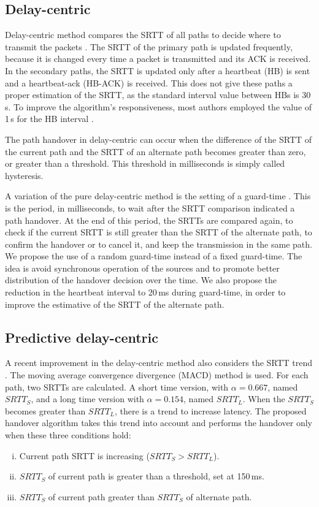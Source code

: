 \documentclass[letterpaper,10pt,oneside,conference,final]{sbrt2015}
\begin{document}
  \subsection{Delay-centric}

  Delay-centric method compares the SRTT of all paths to decide where to transmit the packets \cite{Kelly2004}. The SRTT of the primary path is updated frequently, because it is changed every time a packet is transmitted and its ACK is received. In the secondary paths, the SRTT is updated only after a heartbeat (HB) is sent and a heartbeat-ack (HB-ACK) is received. This does not give these paths a proper estimation of the SRTT, as the standard interval value between HBs is 30\,s. To improve the algorithm's responsiveness, most authors employed the value of 1\,s for the HB interval \cite{Noonan2004b}\cite{Gavriloff2009}\cite{Torres2014}.

The path handover in delay-centric can occur when the difference of the SRTT of the current path and the SRTT of an alternate path becomes greater than zero, or greater than a threshold. This threshold in milliseconds is simply called hysteresis.

A variation of the pure delay-centric method is the setting of a guard-time \cite{Leung2012}. This is the period, in milliseconds, to wait after the SRTT comparison indicated a path handover. At the end of this period, the SRTTs are compared again, to check if the current SRTT is still greater than the SRTT of the alternate path, to confirm the handover or to cancel it, and keep the transmission in the same path. We propose the use of a random guard-time instead of a fixed guard-time. The idea is avoid synchronous operation of the sources and to promote better distribution of the handover decision over the time. We also propose the reduction in the heartbeat interval to 20\,ms during guard-time, in order to improve the estimative of the SRTT of the alternate path.

  \subsection{Predictive delay-centric}

  A recent improvement in the delay-centric method also considers the SRTT trend \cite{Torres2014}. The moving average convergence divergence (MACD) method is used. For each path, two SRTTs are calculated. A short time version, with $\alpha = 0.667$, named $SRTT_S$, and a long time version with $\alpha = 0.154$, named $SRTT_L$. When the $SRTT_S$ becomes greater than $SRTT_L$, there is a trend to increase latency. The proposed handover algorithm takes this trend into account and performs the handover only when these three conditions hold:
\begin{enumerate}[i)]
 \item Current path SRTT is increasing ($SRTT_S > SRTT_L$).
 \item $SRTT_S$ of current path is greater than a threshold, set at 150\,ms.
 \item $SRTT_S$ of current path greater than $SRTT_S$ of alternate path.
\end{enumerate}
\end{document}
